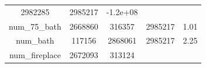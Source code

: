 \documentclass[]{book}
\theoremstyle{definition}
\theoremstyle{definition}
\theoremstyle{definition}
\theoremstyle{remark}
\begin{document}
\begin{longtable}[]{@{}ccccc@{}}
\begin{minipage}[t]{0.13\columnwidth}
2982285\strut
\end{minipage} & \begin{minipage}[t]{0.12\columnwidth}\centering\strut
2985217\strut
\end{minipage} & \begin{minipage}[t]{0.12\columnwidth}\centering\strut
-1.2e+08\strut
\end{minipage}\tabularnewline
\begin{minipage}[t]{0.35\columnwidth}\centering\strut
num\_75\_bath\strut
\end{minipage} & \begin{minipage}[t]{0.12\columnwidth}\centering\strut
2668860\strut
\end{minipage} & \begin{minipage}[t]{0.13\columnwidth}\centering\strut
316357\strut
\end{minipage} & \begin{minipage}[t]{0.12\columnwidth}\centering\strut
2985217\strut
\end{minipage} & \begin{minipage}[t]{0.12\columnwidth}\centering\strut
1.01\strut
\end{minipage}\tabularnewline
\begin{minipage}[t]{0.35\columnwidth}\centering\strut
num\_bath\strut
\end{minipage} & \begin{minipage}[t]{0.12\columnwidth}\centering\strut
117156\strut
\end{minipage} & \begin{minipage}[t]{0.13\columnwidth}\centering\strut
2868061\strut
\end{minipage} & \begin{minipage}[t]{0.12\columnwidth}\centering\strut
2985217\strut
\end{minipage} & \begin{minipage}[t]{0.12\columnwidth}\centering\strut
2.25\strut
\end{minipage}\tabularnewline
\begin{minipage}[t]{0.35\columnwidth}\centering\strut
num\_fireplace\strut
\end{minipage} & \begin{minipage}[t]{0.12\columnwidth}\centering\strut
2672093\strut
\end{minipage} & \begin{minipage}[t]{0.13\columnwidth}\centering\strut
313124\strut
\end{minipage} & \begin{minipage}[t]{0.12\columnwidth}\centering\strut

\end{minipage}
\end{longtable}
\end{document}
